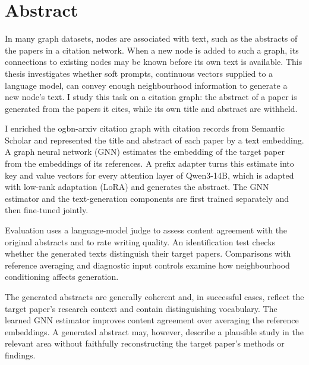 \vfill
\selectenglish


\chapter*{Abstract}

In many graph datasets, nodes are associated with text, such as the abstracts of the papers in a citation network. When a new node is added to such a graph, its connections to existing nodes may be known before its own text is available. This thesis investigates whether soft prompts, continuous vectors supplied to a language model, can convey enough neighbourhood information to generate a new node's text. I study this task on a citation graph: the abstract of a paper is generated from the papers it cites, while its own title and abstract are withheld.

I enriched the ogbn-arxiv citation graph with citation records from Semantic Scholar and represented the title and abstract of each paper by a text embedding. A graph neural network (GNN) estimates the embedding of the target paper from the embeddings of its references. A prefix adapter turns this estimate into key and value vectors for every attention layer of Qwen3-14B, which is adapted with low-rank adaptation (LoRA) and generates the abstract. The GNN estimator and the text-generation components are first trained separately and then fine-tuned jointly.

Evaluation uses a language-model judge to assess content agreement with the original abstracts and to rate writing quality. An identification test checks whether the generated texts distinguish their target papers. Comparisons with reference averaging and diagnostic input controls examine how neighbourhood conditioning affects generation.

The generated abstracts are generally coherent and, in successful cases, reflect the target paper's research context and contain distinguishing vocabulary. The learned GNN estimator improves content agreement over averaging the reference embeddings. A generated abstract may, however, describe a plausible study in the relevant area without faithfully reconstructing the target paper's methods or findings.


\vfill
\selectthesislanguage

\setcounter{romanPage}{\value{page}}
